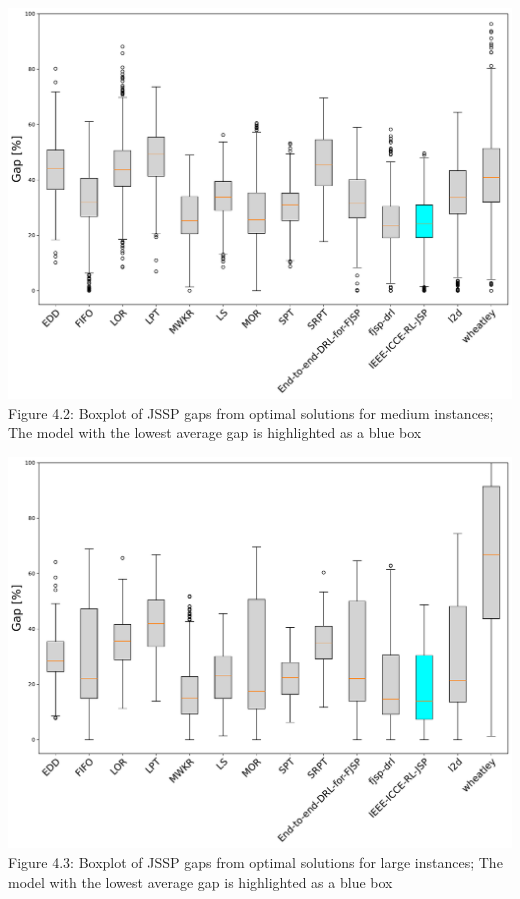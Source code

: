 \begin{center}
    \includegraphics[width=0.8\linewidth]{images/horizontal_boxplot_jssp_medium.pdf}\\
    Figure 4.2: Boxplot of JSSP gaps from optimal solutions for medium instances; The model with the lowest average gap is highlighted as a blue box
\end{center}
\begin{center}
    \includegraphics[width=0.8\linewidth]{images/horizontal_boxplot_jssp_large.pdf}\\
    Figure 4.3: Boxplot of JSSP gaps from optimal solutions for large instances; The model with the lowest average gap is highlighted as a blue box
\end{center}
